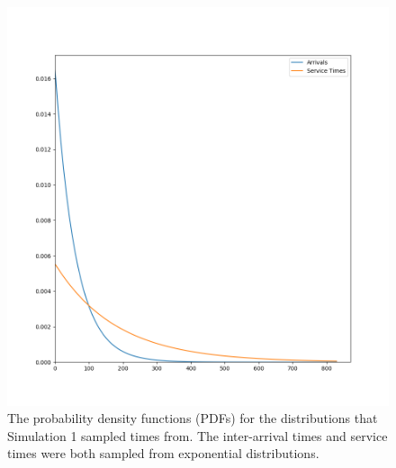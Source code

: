 \begin{figure}[H]
  \includegraphics[width=\textwidth]{figures/montecarlo/expon_expon.png}
  \caption{
    The probability density functions (PDFs) for the distributions that
    Simulation 1 sampled times from.
    The inter-arrival times and service times were both sampled from
    exponential distributions.
  }\label{fig:simple_sim1_dists}
\end{figure}

